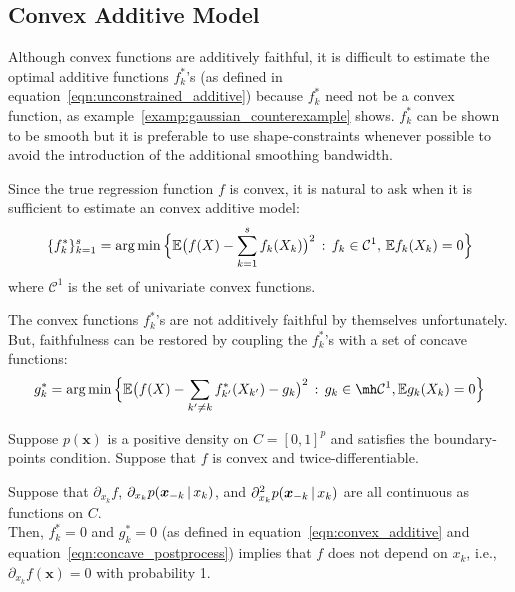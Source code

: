 \subsection{Convex Additive Model}

Although convex functions are additively faithful, it is difficult to estimate the optimal additive functions $f^*_k$'s (as defined in equation~\ref{eqn:unconstrained_additive}) because $f^*_k$ need not be a convex function, as example~\ref{examp:gaussian_counterexample} shows. $f^*_k$ can be shown to be smooth but it is preferable to use shape-constraints whenever possible to avoid the introduction of the additional smoothing bandwidth.

Since the true regression function $f$ is convex, it is natural to ask when it is sufficient to estimate an convex additive model:
\begin{equation}
\label{eqn:convex_additive}
\{ f^*_k \}_{k=1}^s = \arg\min \Big \{ 
    {\mathbb E}\big( f(X) - \sum_{k=1}^s f_k(X_k) \big)^2 \,:\, f_k \in \mathcal{C}^1, \, {\mathbb E} f_k(X_k) = 0 \Big \}
\end{equation}
where $\mathcal{C}^1$ is the set of univariate convex functions.

The convex functions $f^*_k$'s are not additively faithful by themselves unfortunately. But, faithfulness can be restored by coupling the $f^*_k$'s with a set of concave functions:
\begin{equation}
\label{eqn:concave_postprocess}
g^*_k = \arg\min \Big\{
   \E\big( f(X) - \sum_{k' \neq k} f^*_{k'}(X_{k'}) - g_k \big)^2 
    \,:\, g_k \in \mh \mathcal{C}^1, \E g_k(X_k) = 0 
  \Big\}
\end{equation}

\begin{theorem}
\label{thm:acdc_faithful}
Suppose $p(\mathbf{x})$ is a positive density on $C=[0,1]^p$ and satisfies the boundary-points condition. Suppose that $f$ is convex and twice-differentiable.

Suppose that $\partial_{x_k} f$, $\partial_{x_k} p( \mbox{\boldmath $x$}_{-k} {\,|\,} x_k )$, and $\partial_{x_k}^2 p( \mbox{\boldmath $x$}_{-k} {\,|\,} x_k)$ are all continuous as functions on $C$.\\

Then, $f^*_k = 0$ and $g^*_k = 0$ (as defined in equation~\ref{eqn:convex_additive} and equation~\ref{eqn:concave_postprocess}) implies that $f$ does not depend on $x_k$, i.e., $\partial_{x_k} f(\mathbf{x}) = 0$ with probability 1.
\end{theorem}

